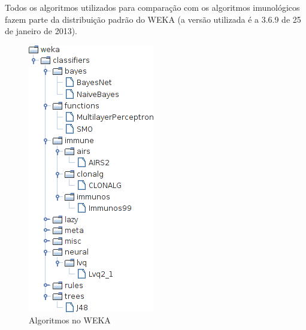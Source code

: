 Todos os algoritmos utilizados para comparação com os algoritmos imunológicos fazem parte da distribuição padrão do WEKA (a versão utilizada é a 3.6.9 de 25 de janeiro de 2013).

\vspace{0.5cm}
\begin{figure}[h]
    \centering
    \caption{Algoritmos no WEKA}
    \label{fig:dev_weka_algos}
    \vspace{0.5cm}
    \includegraphics{img/weka_algos_cropped.png}
    \vspace{0.5cm}
\end{figure}
\vspace{0.5cm}

